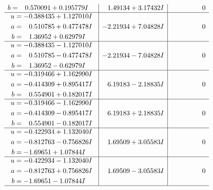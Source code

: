 \documentclass[1p]{elsarticle_modified}
\theoremstyle{definition}
\begin{document}
$$\begin{array}{c|c|c}
\begin{aligned}
b &= \phantom{-}0.570091 + 0.195779 I\end{aligned}
 & \phantom{-}1.49134 + 3.17432 I & \phantom{-0.000000 } 0 \\ \hline\begin{aligned}
u &= -0.388435 + 1.127010 I \\
a &= \phantom{-}0.510785 + 0.477478 I \\
b &= \phantom{-}1.36952 + 0.62979 I\end{aligned}
 & -2.21934 + 7.04828 I & \phantom{-0.000000 } 0 \\ \hline\begin{aligned}
u &= -0.388435 - 1.127010 I \\
a &= \phantom{-}0.510785 - 0.477478 I \\
b &= \phantom{-}1.36952 - 0.62979 I\end{aligned}
 & -2.21934 - 7.04828 I & \phantom{-0.000000 } 0 \\ \hline\begin{aligned}
u &= -0.319466 + 1.162990 I \\
a &= -0.414309 + 0.895417 I \\
b &= \phantom{-}0.554901 + 0.182017 I\end{aligned}
 & \phantom{-}6.19183 - 2.18835 I & \phantom{-0.000000 } 0 \\ \hline\begin{aligned}
u &= -0.319466 - 1.162990 I \\
a &= -0.414309 - 0.895417 I \\
b &= \phantom{-}0.554901 - 0.182017 I\end{aligned}
 & \phantom{-}6.19183 + 2.18835 I & \phantom{-0.000000 } 0 \\ \hline\begin{aligned}
u &= -0.422934 + 1.132040 I \\
a &= -0.812763 - 0.756826 I \\
b &= -1.69651 + 1.07844 I\end{aligned}
 & \phantom{-}1.69509 + 3.05583 I & \phantom{-0.000000 } 0 \\ \hline\begin{aligned}
u &= -0.422934 - 1.132040 I \\
a &= -0.812763 + 0.756826 I \\
b &= -1.69651 - 1.07844 I\end{aligned}
 & \phantom{-}1.69509 - 3.05583 I & \phantom{-0.000000 } 0\\
 \hline 
 \end{array}$$\newpage$$\begin{array}{c|c|c}  

\end{array}$$
\end{document}
